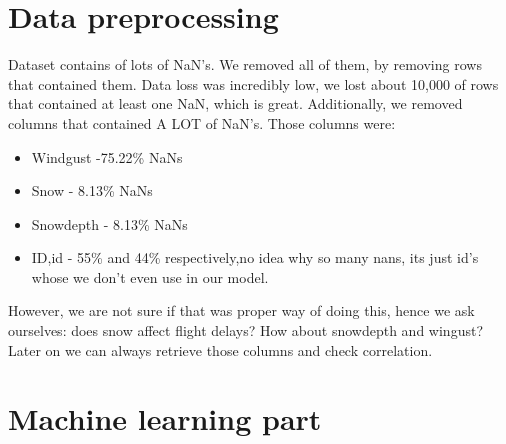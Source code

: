\documentclass{article}
\begin{document}
\newpage
\section{Data preprocessing}
Dataset contains of lots of NaN's. We removed all of them, by removing rows that contained them. Data loss
was incredibly low, we lost about 10,000 of rows that contained at least one NaN, which is great. Additionally,
we removed columns that contained A LOT of NaN's. Those columns were:
	\begin{itemize}
		\item Windgust -75.22\% NaNs
		\item Snow - 8.13\% NaNs
		\item Snowdepth - 8.13\% NaNs
		\item ID,id - 55\% and 44\% respectively,no idea why so many nans, its just id's whose we don't even use in our model.
	\end{itemize}


However, we are not sure if that was proper way of doing this, hence we ask ourselves: does snow affect flight delays? How about snowdepth and wingust? Later on we can always retrieve those columns and check correlation.

\section{Machine learning part}
\end{document}
